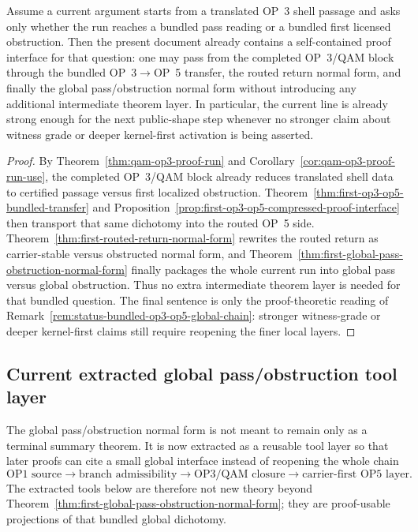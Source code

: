 \begin{corollary}
\label{cor:current-sufficiency-bundled-op3-op5-global}
Assume a current argument starts from a translated OP~3 shell passage and asks only whether the run reaches a bundled pass reading or a bundled first licensed obstruction. Then the present document already contains a self-contained proof interface for that question: one may pass from the completed OP~3/QAM block through the bundled OP~3$\to$OP~5 transfer, the routed return normal form, and finally the global pass/obstruction normal form without introducing any additional intermediate theorem layer. In particular, the current line is already strong enough for the next public-shape step whenever no stronger claim about witness grade or deeper kernel-first activation is being asserted.
\end{corollary}

\begin{proof}
By Theorem~\ref{thm:qam-op3-proof-run} and Corollary~\ref{cor:qam-op3-proof-run-use}, the completed OP~3/QAM block already reduces translated shell data to certified passage versus first localized obstruction. Theorem~\ref{thm:first-op3-op5-bundled-transfer} and Proposition~\ref{prop:first-op3-op5-compressed-proof-interface} then transport that same dichotomy into the routed OP~5 side. Theorem~\ref{thm:first-routed-return-normal-form} rewrites the routed return as carrier-stable versus obstructed normal form, and Theorem~\ref{thm:first-global-pass-obstruction-normal-form} finally packages the whole current run into global pass versus global obstruction. Thus no extra intermediate theorem layer is needed for that bundled question. The final sentence is only the proof-theoretic reading of Remark~\ref{rem:status-bundled-op3-op5-global-chain}: stronger witness-grade or deeper kernel-first claims still require reopening the finer local layers.
\end{proof}


\subsection{Current extracted global pass/obstruction tool layer}
\label{sec:current-extracted-global-pass-obstruction-tool-layer}

\begin{remark}
The global pass/obstruction normal form is not meant to remain only as a terminal summary theorem. It is now extracted as a reusable tool layer so that later proofs can cite a small global interface instead of reopening the whole chain
\[
\text{OP1 source}
\to
\text{branch admissibility}
\to
\text{OP3/QAM closure}
\to
\text{carrier-first OP5 layer}.
\]
The extracted tools below are therefore not new theory beyond Theorem~\ref{thm:first-global-pass-obstruction-normal-form}; they are proof-usable projections of that bundled global dichotomy.
\end{remark}


